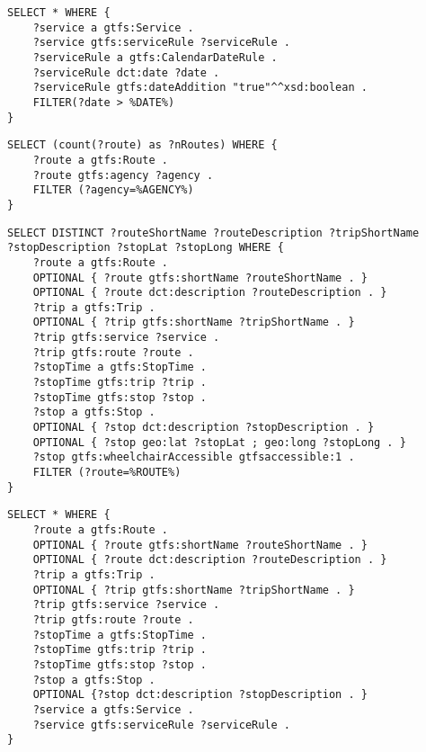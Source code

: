 \begin{lstlisting}[caption=Query 5 - Services that have been added on a specific day, label=lst:sparql5, basicstyle=\ttfamily,frame=single]
SELECT * WHERE {
	?service a gtfs:Service .
	?service gtfs:serviceRule ?serviceRule .
	?serviceRule a gtfs:CalendarDateRule .
	?serviceRule dct:date ?date .
	?serviceRule gtfs:dateAddition "true"^^xsd:boolean .
	FILTER(?date > %DATE%)
}
\end{lstlisting}

\begin{lstlisting}[caption=Query 6 - Check the number of routes of a particular agency, label=lst:sparql6,
   basicstyle=\ttfamily,frame=single]
SELECT (count(?route) as ?nRoutes) WHERE {
	?route a gtfs:Route .
	?route gtfs:agency ?agency .
	FILTER (?agency=%AGENCY%)
}
\end{lstlisting}


\begin{lstlisting}[caption={Query 7 - List all wheelchair accessible stops along a particular route, with some of their additional data}, label=lst:sparql7, basicstyle=\ttfamily,frame=single]
SELECT DISTINCT ?routeShortName ?routeDescription ?tripShortName
?stopDescription ?stopLat ?stopLong WHERE {
	?route a gtfs:Route .
	OPTIONAL { ?route gtfs:shortName ?routeShortName . }
	OPTIONAL { ?route dct:description ?routeDescription . }
	?trip a gtfs:Trip .
	OPTIONAL { ?trip gtfs:shortName ?tripShortName . }
	?trip gtfs:service ?service .
	?trip gtfs:route ?route .
	?stopTime a gtfs:StopTime . 
	?stopTime gtfs:trip ?trip . 
	?stopTime gtfs:stop ?stop . 
	?stop a gtfs:Stop . 
	OPTIONAL { ?stop dct:description ?stopDescription . }
	OPTIONAL { ?stop geo:lat ?stopLat ; geo:long ?stopLong . }
	?stop gtfs:wheelchairAccessible gtfsaccessible:1 .
	FILTER (?route=%ROUTE%)
}
\end{lstlisting}

\begin{lstlisting}[caption={Query 8 - List the routes and their related trips, services, stops and stop times with some of their additional data, if available}, label=lst:sparql8, basicstyle=\ttfamily,frame=single]
SELECT * WHERE {
	?route a gtfs:Route .
	OPTIONAL { ?route gtfs:shortName ?routeShortName . }
	OPTIONAL { ?route dct:description ?routeDescription . }
	?trip a gtfs:Trip .
	OPTIONAL { ?trip gtfs:shortName ?tripShortName . }
	?trip gtfs:service ?service .
	?trip gtfs:route ?route .
	?stopTime a gtfs:StopTime . 
	?stopTime gtfs:trip ?trip . 
	?stopTime gtfs:stop ?stop . 
	?stop a gtfs:Stop . 
	OPTIONAL {?stop dct:description ?stopDescription . }
	?service a gtfs:Service .
	?service gtfs:serviceRule ?serviceRule .
}
\end{lstlisting}

